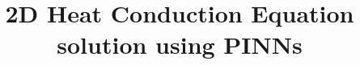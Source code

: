 \documentclass{beamer}
\title{2D Heat Conduction Equation solution using PINNs}
\begin{document}
\begin{frame}
	\maketitle
\end{frame}




\end{document}
